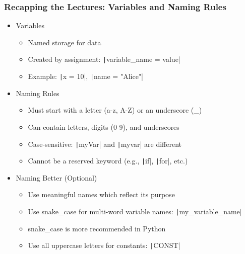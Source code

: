 \documentclass{beamer}
\begin{document}
\begin{frame}
    \frametitle{Recapping the Lectures: Variables and Naming Rules}
    \begin{itemize}
        \item Variables
              \begin{itemize}
                  \item Named storage for data
                  \item Created by assignment: \texttt|variable_name = value|
                  \item Example: \texttt|x = 10|, \texttt|name = "Alice"|
              \end{itemize}
        \item Naming Rules
              \begin{itemize}
                  \item Must start with a letter (a-z, A-Z) or an underscore (\_)
                  \item Can contain letters, digits (0-9), and underscores
                  \item Case-sensitive: \texttt|myVar| and \texttt|myvar| are different
                  \item Cannot be a reserved keyword (e.g., \texttt|if|, \texttt|for|, etc.)
              \end{itemize}
        \item Naming Better (Optional)
              \begin{itemize}
                  \item Use meaningful names which reflect its purpose
                  \item Use snake\_case for multi-word variable names: \texttt|my_variable_name|
                  \item  snake\_case is more recommended in Python
                  \item Use all uppercase letters for constants: \texttt|CONST|
              \end{itemize}
    \end{itemize}
\end{frame}
\end{document}

